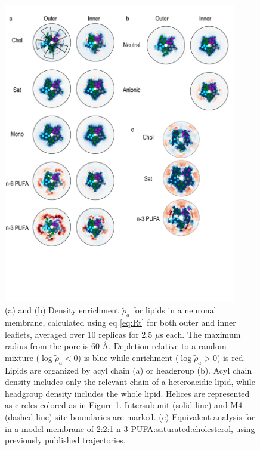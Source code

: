 \begin{figure}[!h]
	\center
	\includegraphics[width=4in]{./Figures/acyl_heatmap.pdf}
	\caption[Lipid density enrichment around a central singular \nachr.]  {(a) and (b) Density enrichment $\tilde{\rho}_{a}$ for lipids in a neuronal membrane, calculated using eq \ref{eq:Rt} for both outer and inner leaflets, averaged over 10 replicas for 2.5 $\mu$s each. The maximum radius from the \nachr{} pore is 60 \AA. Depletion relative to a random mixture ($\log\tilde{\rho}_{a}< 0$) is blue while enrichment ($\log\tilde{\rho}_{a}> 0$) is red. Lipids are organized by acyl chain (a) or headgroup (b). Acyl chain density includes only the relevant chain of a heteroacidic lipid, while headgroup density includes the whole lipid.  Helices are represented as circles colored as in Figure 1. Intersubunit (solid line) and M4 (dashed line) site boundaries are marked.  (c) Equivalent analysis for \nachr{} in a model membrane of 2:2:1 n-3 PUFA:saturated:cholesterol, using previously published trajectories\cite{Woods2019}. } 
	\label{fig:acyl_map}
\end{figure}

